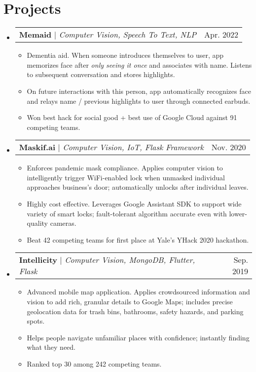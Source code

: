 \documentclass[letterpaper,11pt]{article}
\makeatletter
\newcommand{\resumeItem}[1]{
  \item\small{
    {#1 \vspace{-2pt}}
  }
}
\newcommand{\resumeProjectHeading}[2]{
    \item
    \begin{tabular*}{0.97\textwidth}{l@{\extracolsep{\fill}}r}
      \small#1 & #2 \\
    \end{tabular*}\vspace{-7pt}
}
\newcommand{\resumeSubHeadingListStart}{\begin{itemize}[leftmargin=0.15in, label={}]}
\newcommand{\resumeSubHeadingListEnd}{\end{itemize}}
\newcommand{\resumeItemListStart}{\begin{itemize}}
\newcommand{\resumeItemListEnd}{\end{itemize}\vspace{-5pt}}
\makeatother
\begin{document}
\section{Projects}
    \resumeSubHeadingListStart
      \resumeProjectHeading
          {\textbf{Memaid} $|$ \emph{Computer Vision, Speech To Text, NLP}}{Apr. 2022}
          \resumeItemListStart
            \resumeItem{Dementia aid. When someone introduces themselves to user, app memorizes face after \textit{only seeing it once} and associates with name. Listens to subsequent conversation and stores highlights.}
            \resumeItem{On future interactions with this person, app automatically recognizes face and relays name / previous highlights to user through connected earbuds.}
            \resumeItem{Won best hack for social good + best use of Google Cloud against 91 competing teams.}
          \resumeItemListEnd
      \resumeProjectHeading
          {\textbf{Maskif.ai} $|$ \emph{Computer Vision, IoT, Flask Framework}}{Nov. 2020}
          \resumeItemListStart
            \resumeItem{Enforces pandemic mask compliance. Applies computer vision to intelligently trigger WiFi-enabled lock when unmasked individual approaches business's door; automatically unlocks after individual leaves.}
            \resumeItem{Highly cost effective. Leverages Google Assistant SDK to support wide variety of smart locks; fault-tolerant algorithm accurate even with lower-quality cameras.}
            \resumeItem{Beat 42 competing teams for first place at Yale's YHack 2020 hackathon.}
          \resumeItemListEnd
      \resumeProjectHeading
          {\textbf{Intellicity} $|$ \emph{Computer Vision, MongoDB, Flutter, Flask}}{Sep. 2019}
          \resumeItemListStart
            \resumeItem{Advanced mobile map application. Applies crowdsourced information and vision to add rich, granular details to Google Maps; includes precise geolocation data for trash bins, bathrooms, safety hazards, and parking spots.}
            \resumeItem{Helps people navigate unfamiliar places with confidence; instantly finding what they need.}
            \resumeItem{Ranked top 30 among 242 competing teams.}
          \resumeItemListEnd
    \resumeSubHeadingListEnd








\end{document}
